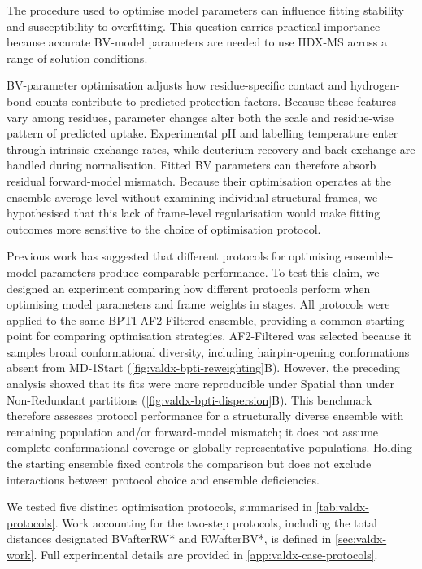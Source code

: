 The procedure used to optimise model parameters can influence fitting stability and susceptibility to overfitting. This question carries practical importance because accurate BV-model parameters are needed to use HDX-MS across a range of solution conditions.

BV-parameter optimisation adjusts how residue-specific contact and hydrogen-bond counts contribute to predicted protection factors. Because these features vary among residues, parameter changes alter both the scale and residue-wise pattern of predicted uptake. Experimental pH and labelling temperature enter through intrinsic exchange rates, while deuterium recovery and back-exchange are handled during normalisation. Fitted BV parameters can therefore absorb residual forward-model mismatch. Because their optimisation operates at the ensemble-average level without examining individual structural frames, we hypothesised that this lack of frame-level regularisation would make fitting outcomes more sensitive to the choice of optimisation protocol.

Previous work has suggested that different protocols for optimising ensemble-model parameters produce comparable performance.\supercite{jiaIntegratingHydrogenDeuterium2023} To test this claim, we designed an experiment comparing how different protocols perform when optimising model parameters and frame weights in stages. All protocols were applied to the same BPTI AF2-Filtered ensemble, providing a common starting point for comparing optimisation strategies. AF2-Filtered was selected because it samples broad conformational diversity, including hairpin-opening conformations absent from MD-1Start (\cref{fig:valdx-bpti-reweighting}B). However, the preceding analysis showed that its fits were more reproducible under Spatial than under Non-Redundant partitions (\cref{fig:valdx-bpti-dispersion}B). This benchmark therefore assesses protocol performance for a structurally diverse ensemble with remaining population and/or forward-model mismatch; it does not assume complete conformational coverage or globally representative populations. Holding the starting ensemble fixed controls the comparison but does not exclude interactions between protocol choice and ensemble deficiencies.

We tested five distinct optimisation protocols, summarised in \cref{tab:valdx-protocols}. Work accounting for the two-step protocols, including the total distances designated BVafterRW* and RWafterBV*, is defined in \cref{sec:valdx-work}. Full experimental details are provided in \cref{app:valdx-case-protocols}.

